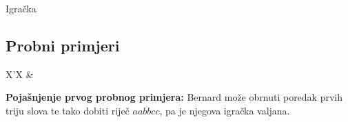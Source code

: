 \begin{statement}[
  problempoints=100,
  timelimit=1 sekunda,
  memorylimit=512 MiB,
]{Igračka}
\subsection*{Probni primjeri}
\begin{tabularx}{\textwidth}{X'X}
 &
\end{tabularx}

\textbf{Pojašnjenje prvog probnog primjera:} Bernard može obrnuti poredak
prvih triju slova te tako dobiti riječ $aabbcc$, pa je njegova igračka
valjana.

\end{statement}

